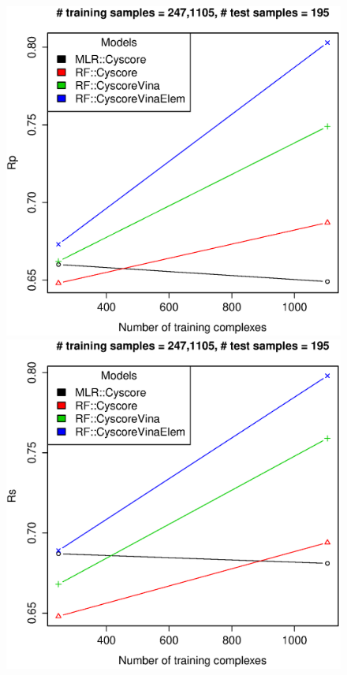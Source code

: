 \documentclass[journal=jacsat,manuscript=article]{achemso}
\begin{document}
\begin{figure}[ht!]
\endminipage
{}
\includegraphics[width=\linewidth]{../rfcyscore/tst-195-pcor.eps}
\endminipage
{}
\includegraphics[width=\linewidth]{../rfcyscore/tst-195-scor.eps}

\end{figure}
\end{document}
